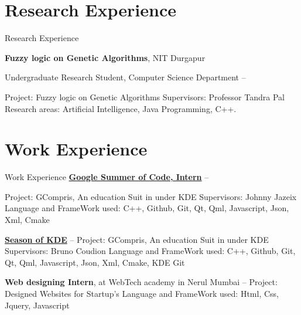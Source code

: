 \documentclass[letterpaper,10pt,oneside]{article}
\begin{document}
\begin{body}
\begin{detail}

\section
{Research Experience}
{Research Experience}
{}

{\textbf{Fuzzy logic on Genetic Algorithms}},
NIT Durgapur

\GapNoBreak
\BulletItem
Undergraduate Research Student, Computer Science Department
\hfill
{} --
\begin{detail}
\SubBulletItem
Project:
Fuzzy logic on Genetic Algorithms
\SubBulletItem
Supervisors:
Professor Tandra Pal
\SubBulletItem
Research areas:
Artificial Intelligence, Java Programming, C++.
\end{detail}


\section
{Work Experience}
{Work Experience}
{}
\href{https://summerofcode.withgoogle.com/projects/#4970588472868864}
{\textbf{Google Summer of Code, Intern}}
\hfill
{} --
\GapNoBreak
\begin{detail}
\SubBulletItem
Project:
GCompris, An education Suit in under KDE
\SubBulletItem
Supervisors:
Johnny Jazeix
\SubBulletItem
Language and FrameWork used:
C++, Github, Git, Qt, Qml, Javascript, Json, Xml, Cmake
\GapNoBreak
\GapNoBreak
\GapNoBreak

\href{https://season.kde.org/?q=view_projects&prg=36&p=511#}
{\textbf{Season of KDE}}
\hfill
{} --
\SubBulletItem
Project:
GCompris, An education Suit in under KDE
\SubBulletItem
Supervisors:
Bruno Coudion
\SubBulletItem
Language and FrameWork used:
C++, Github, Git, Qt, Qml, Javascript, Json, Xml, Cmake, KDE Git

\GapNoBreak
\GapNoBreak
\GapNoBreak

{\textbf{Web designing Intern}}, at WebTech academy in Nerul Mumbai
\hfill
{} --
\SubBulletItem
Project:
Designed Websites for Startup's
\SubBulletItem
Language and FrameWork used:
Html, Css, Jquery, Javascript 


\end{detail}




\end{detail}
\end{body}
\end{document}
